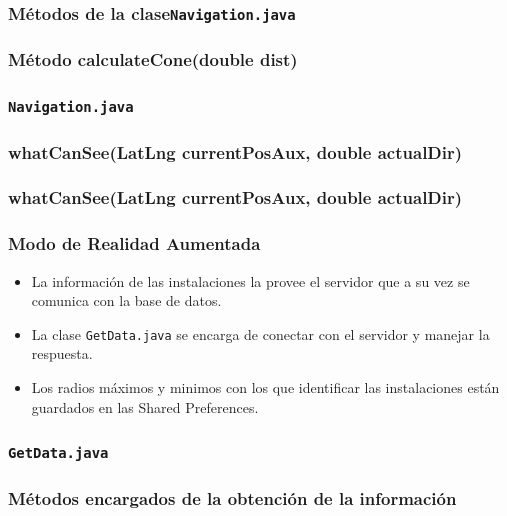 \begin{frame}
	\frametitle{Métodos de la clase\texttt{Navigation.java}}
	
\end{frame}

\begin{frame}
	\frametitle{Método calculateCone(double dist)}
	
\end{frame}
	  
\begin{frame}
	\frametitle{\texttt{Navigation.java}}
	
	
\end{frame}

     
\begin{frame}
	\frametitle{whatCanSee(LatLng currentPosAux, double actualDir)}
	
\end{frame}
\begin{frame}
	\frametitle{whatCanSee(LatLng currentPosAux, double actualDir)}
	
\end{frame}


\begin{frame}
	\frametitle{Modo de Realidad Aumentada}
			\begin{itemize}
				\item La información de las instalaciones la provee el servidor que a su vez se comunica con la base de datos.
				\item La clase \texttt{GetData.java} se encarga de conectar con el servidor y manejar la respuesta.
				\item Los radios máximos y minimos con los que identificar las instalaciones están guardados en las Shared Preferences.
			\end{itemize}
			\endblock{}
\end{frame}

\begin{frame}
	\frametitle{\texttt{GetData.java}}
	
\end{frame}

\begin{frame}
	\frametitle{Métodos encargados de la obtención de la información}
	
	
\end{frame}

